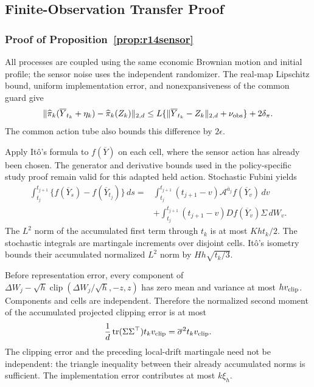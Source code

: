 \subsection{Finite-Observation Transfer Proof}\label{app:r14sensingproof}
\subsubsection{Proof of Proposition~\ref{prop:r14sensor}}
All processes are coupled using the same economic Brownian motion and
initial profile; the sensor noise uses the independent randomizer.
The real-map Lipschitz bound, uniform implementation error, and
nonexpansiveness of the common guard give
\[
 \|\widehat\pi_k(\overline Y_{t_k}+\eta_k)
                  -\widehat\pi_k(Z_k)\|_{2,d}
 \leq L\{\|\overline Y_{t_k}-Z_k\|_{2,d}+\nu_{\rm obs}\}+2\delta_\pi.
\]
The common action tube also bounds this difference by $2\epsilon$.

Apply It\^o's formula to $f(\overline Y)$ on each cell, where the
sensor action has already been chosen. The generator and derivative
bounds used in the policy-specific study proof remain valid for this adapted held action.
Stochastic Fubini yields
\begin{align*}
 \int_{t_j}^{t_{j+1}}
       \{f(\overline Y_s)-f(\overline Y_{t_j})\}\,ds
 ={}&\int_{t_j}^{t_{j+1}}(t_{j+1}-v)
       \mathcal A^{\overline a_j}f(\overline Y_v)\,dv\\
 &+\int_{t_j}^{t_{j+1}}(t_{j+1}-v)
             Df(\overline Y_v)\Sigma\,dW_v.
\end{align*}
The $L^2$ norm of the accumulated first term through $t_k$ is at most
$Kht_k/2$. The stochastic integrals are martingale increments over
disjoint cells. It\^o's isometry bounds their accumulated normalized
$L^2$ norm by $Hh\sqrt{t_k/3}$.

Before representation error, every component of
$\Delta W_j-\sqrt h\operatorname{clip}(\Delta W_j/\sqrt h,-z,z)$
has zero mean and variance at most $hv_{\rm clip}$. Components and cells are
independent. Therefore the normalized second moment of the accumulated
projected clipping error is at most
\[
 \frac1d\operatorname{tr}(\Sigma\Sigma^\top)t_kv_{\rm clip}
       =\overline\sigma^2t_kv_{\rm clip}.
\]
The clipping error and the preceding local-drift martingale need not
be independent: the triangle inequality between their already
accumulated norms is sufficient. The implementation error contributes
at most $k\xi_h$.

